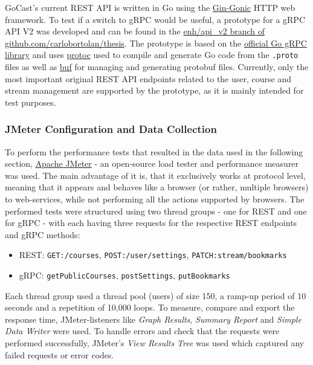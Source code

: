 GoCast's current REST \ac{API} is written in Go using the \href{https://github.com/gin-gonic/gin}{Gin-Gonic} HTTP web framework. To test if a switch to gRPC would be useful, a prototype for a gRPC \ac{API} V2 was developed and can be found in the \href{https://github.com/carlobortolan/thesis/tree/enh/api\_v2}{enh/api\_v2 branch of github.com/carlobortolan/thesis}.
The prototype is based on the \href{https://google.golang.org/grpc}{official Go gRPC library} and uses \href{https://github.com/protocolbuffers/protobuf}{protoc} used to compile and generate Go code from the \texttt{.proto} files as well as \href{https://github.com/bufbuild/buf}{buf} for managing and generating protobuf files. Currently, only the most important original REST \ac{API} endpoints related to the user, course and stream management are supported by the prototype, as it is mainly intended for test purposes.

\subsubsection{JMeter Configuration and Data Collection}

To perform the performance tests that resulted in the data used in the following section, \href{https://jmeter.apache.org/}{Apache JMeter} - an open-source load tester and performance measurer was used. The main advantage of it is, that it exclusively works at protocol level, meaning that it appears and behaves like a browser (or rather, multiple browsers) to web-services, while not performing all the actions supported by browsers. The performed tests were structured using two thread groups - one for REST and one for gRPC - with each having three requests for the respective REST endpoints and gRPC methods:
\begin{itemize}
    \item REST: \texttt{GET:/courses}, \texttt{POST:/user/settings}, \texttt{PATCH:stream/bookmarks}
    \item gRPC: \texttt{getPublicCourses}, \texttt{postSettings}, \texttt{putBookmarks}
\end{itemize}
Each thread group used a thread pool (users) of size 150, a ramp-up period of 10 seconds and a repetition of 10,000 loops.
To measure, compare and export the response time, JMeter-listeners like \textit{Graph Results}, \textit{Summary Report} and \textit{Simple Data Writer} were used. To handle errors and check that the requests were performed successfully, JMeter’s \textit{View Results Tree} was used which captured any failed requests or error codes.

